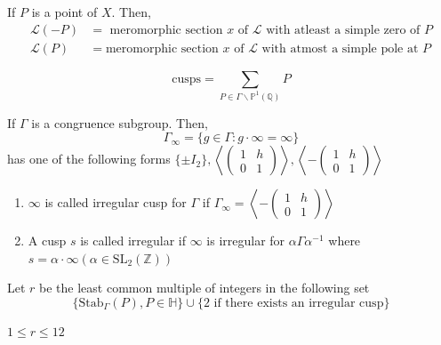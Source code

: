 \documentclass[oneside, 12pt, ]{scrbook}
\newcommand{\QQ}{\mathbb Q}
\newcommand{\ZZ}{\mathbb Z}
\newcommand{\PP}{\mathbb{P}}
\newcommand{\SL}{\mathrm{SL}}
\newcommand{\bs}{\backslash}
\theoremstyle{theorem}
\begin{document}
\begin{example}
If $P$ is a point of $X$. Then, 
\begin{align*}
\mathcal{L}(-P) &= \text{ meromorphic section $x$ of $\mathcal{L}$ with atleast a simple zero of $P$}\\
\mathcal{L}(P) &= \text{meromorphic section $x$ of $\mathcal{L}$ with atmost a simple pole at $P$}
\end{align*}
\end{example}

\begin{definition}
$$\text{cusps} =\sum_{P \in \Gamma \bs \PP^1(\QQ)} P$$
\end{definition}

If $\Gamma$ is a congruence subgroup. Then, $$\Gamma_{\infty} =\{g \in \Gamma: g \cdot \infty = \infty\}$$ has one of the following forms $\{\pm I_{2}\}, \left\langle \begin{pmatrix}
1 & h \\ 0 & 1 
\end{pmatrix} \right\rangle, \left\langle -\begin{pmatrix}
1 & h \\ 0 & 1 
\end{pmatrix} \right\rangle$

\begin{definition}
\begin{enumerate}
\item $\infty$ is called irregular cusp for $\Gamma$ if $\Gamma_{\infty} = \left\langle -\begin{pmatrix}
1 & h \\ 0 & 1 
\end{pmatrix} \right\rangle$
\item A cusp $s$ is called irregular if $\infty$ is irregular for $\alpha \Gamma \alpha^{-1}$ where $s= \alpha \cdot \infty (\alpha \in \SL_{2}(\ZZ))$
\end{enumerate}
\end{definition}

\begin{definition}
Let $r$ be the least common multiple of integers in the following set $$\{\mathrm{Stab}_{\Gamma}(P), P \in \mathbb{H}\} \cup \{2 \text{ if there exists an irregular cusp}\}$$
\end{definition}

\begin{exercise}
$1\le r \le 12$
\end{exercise}
\end{document}
